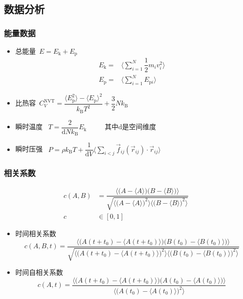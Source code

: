 \subsection{数据分析}
\frame
{
	\frametitle{能量数据}
	\begin{itemize}
		\item 总能量~$E=E_{\mathrm{k}}+E_{\mathrm{p}}$
\begin{displaymath}
	\begin{aligned}
		E_{\mathrm{k}}=&\bigg\langle\sum\limits_{i=1}^N\dfrac12m_iv_i^2\bigg\rangle\\
		E_{\mathrm{p}}=&\bigg\langle\sum\limits_{i=1}^NE_{\mathrm{p}i}\bigg\rangle 
	\end{aligned}
\end{displaymath}
\item 比热容~$C_V^{\mathrm{NVT}}=\dfrac{\big\langle E_{\mathrm{p}}^2\big\rangle-\big\langle E_{\mathrm{p}}\big\rangle^2}{k_{\mathrm{B}}T^2}+\dfrac32Nk_{\mathrm{B}}$
\item 瞬时温度 ~$T=\dfrac2{\mathrm{d}Nk_{\mathrm{B}}}E_{\mathrm{k}}$ ~~~~ 其中$\mathrm{d}$是空间维度
\item 瞬时压强 ~$P=\rho k_{\mathrm{B}}T+\dfrac1{\mathrm{d}V}\bigg\langle\sum\limits_{i<j}\vec f_{ij}(\vec r_{ij})\cdot\vec r_{ij}\bigg\rangle$
	\end{itemize}
}

\frame
{
	\frametitle{相关系数}
	\begin{displaymath}
		\begin{aligned}
			c(A,B)&=\dfrac{\big\langle\big(A-\langle A\rangle\big)\big(B-\langle B\rangle\big)\big\rangle}{\sqrt{\big\langle\big(A-\langle A\rangle\big)^2\big\rangle\big\langle\big(B-\langle B\rangle\big)^2\big\rangle}}\\
			c&\in[0,1]
		\end{aligned}
	\end{displaymath}
	\begin{itemize}
		\item 时间相关系数\\
			\begin{displaymath}
				c(A,B,t)=\dfrac{\big\langle\big(A(t+t_0)-\langle A(t+t_0)\rangle\big)\big(B(t_0)-\langle B(t_0)\rangle\big)\big\rangle}{\sqrt{\big\langle\big(A(t+t_0)-\langle A(t+t_0)\rangle\big)^2\big\rangle\big\langle\big(B(t_0)-\langle B(t_0)\rangle\big)^2\big\rangle}}
			\end{displaymath}
		\item 时间自相关系数
			\begin{displaymath}
				c(A,t)=\dfrac{\big\langle\big(A(t+t_0)-\langle A(t+t_0)\rangle\big)\big(A(t_0)-\langle A(t_0)\rangle\big)\big\rangle}{\big\langle\big(A(t_0)-\langle A(t_0)\rangle\big)^2\big\rangle}
			\end{displaymath}
	\end{itemize}
}


